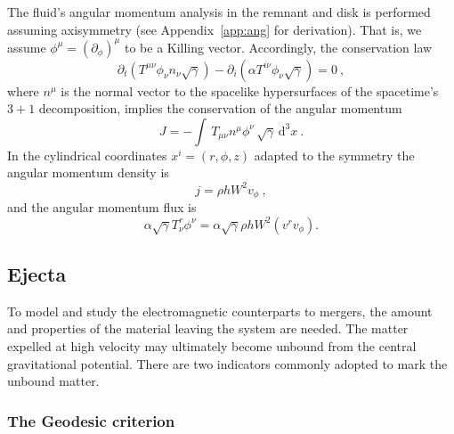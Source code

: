 \documentclass[11pt,a4paper,headinclude=true,DIV=14,BCOR=8mm,chapterprefix,listof=totoc,twoside,openright,abstracton]{scrbook}
\newcommand{\dd}{\text{d}}
\begin{document}

The fluid's angular momentum analysis in the remnant and disk is performed
assuming axisymmetry (see Appendix~\ref{app:ang} for derivation).
 That is, we assume $\phi^{\mu} = (\partial_{\phi})^{\mu}$ to be a Killing
vector. Accordingly, the conservation law
\begin{equation}
\partial_t(T^{\mu\nu}\phi_{\nu}n_{\nu}\sqrt{\gamma}) -
\partial_i(\alpha T^{i \nu}\phi_{\nu}\sqrt{\gamma}) = 0 \ ,
\end{equation}
where $n^\mu$ is the normal vector to the spacelike hypersurfaces of
the spacetime's $3+1$ decomposition, 
implies the conservation of the angular momentum
\begin{equation}
J = %
-\int \,
T_{\mu\nu}n^{\mu}\phi^{\nu}\,\sqrt{\gamma}\, \dd^3 x\ .
\end{equation}
In the cylindrical coordinates $x^i=(r,\phi,z)$ adapted to the symmetry
the angular momentum density is  
\begin{equation}
j = %
\rho h W^2 v_{\phi} \ ,
\label{eq:intro:ang_mom}
\end{equation}
and the angular momentum flux is 
\begin{equation}
\alpha\sqrt{\gamma}T^r _{\nu}\phi^{\nu} =
\alpha\sqrt{\gamma}\rho h W^2 (v^{r}v_{\phi}) .
\end{equation}


\subsection{Ejecta}


To model and study the electromagnetic counterparts to mergers, the amount and properties of the material
leaving the system are needed.
The matter expelled at high velocity may ultimately become unbound from the central gravitational
potential. There are two indicators commonly adopted to mark the unbound matter.

\subsubsection{The Geodesic criterion}
\end{document}
